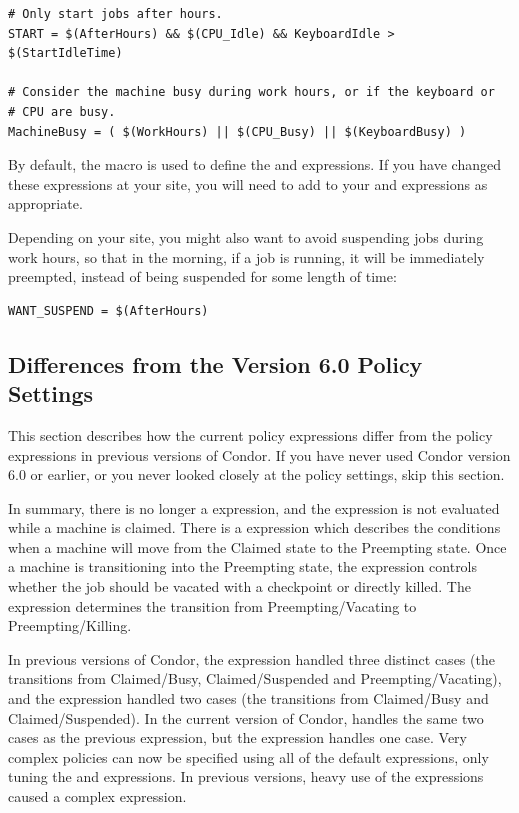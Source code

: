 \begin{verbatim}
# Only start jobs after hours.
START = $(AfterHours) && $(CPU_Idle) && KeyboardIdle > $(StartIdleTime)

# Consider the machine busy during work hours, or if the keyboard or
# CPU are busy.
MachineBusy = ( $(WorkHours) || $(CPU_Busy) || $(KeyboardBusy) )
\end{verbatim}

By default, the  macro is used to define the
 and  expressions.  
If you have changed these expressions at your site, you will need to
add  to your  and 
expressions as appropriate.  

Depending on your site, you might also want to avoid suspending jobs
during work hours, so that in the morning, if a job is running, it
will be immediately preempted, instead of being suspended for some
length of time:

\begin{verbatim}
WANT_SUSPEND = $(AfterHours)
\end{verbatim}


\subsection{\label{sec:V60-Policy-diffs}Differences from the 
Version 6.0 Policy Settings}

This section describes how the current policy expressions
differ from the policy expressions in previous versions of Condor.
If you have never used Condor version 6.0 or earlier, or you never looked
closely at the policy settings, skip this section.

In summary, there is no longer a  expression, and the
 expression is not evaluated while a machine is claimed. 
There is a  expression which describes the
conditions when a machine will move from the Claimed state to the
Preempting state.
Once a machine is transitioning into the Preempting state, the
 expression controls whether the job should
be vacated with a checkpoint or directly killed.
The  expression determines the transition from
Preempting/Vacating to Preempting/Killing.  

In previous versions of Condor,
the  expression handled three distinct cases
(the transitions from Claimed/Busy, Claimed/Suspended and
Preempting/Vacating), and the  expression handled
two cases (the transitions from Claimed/Busy and Claimed/Suspended).
In the current version of Condor,  handles the
same two cases as the previous  expression,
but the  expression handles one case.
Very complex policies can now be specified using all of
the default expressions, only tuning the  and
 expressions.
In previous versions, heavy use of the 
expressions caused a complex  expression.
